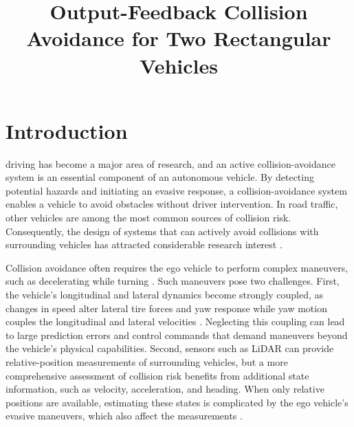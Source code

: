 \documentclass[journal]{IEEEtran}
\title{Output-Feedback Collision Avoidance for Two Rectangular Vehicles}
\author{}
\theoremstyle{definition}
\begin{document}
\maketitle

\begin{abstract}
\end{abstract}

\begin{IEEEkeywords}
\end{IEEEkeywords}

\section{Introduction}

 driving has become a major area of research,
and an active collision-avoidance system is an essential component of an
autonomous vehicle. By detecting potential hazards and initiating an
evasive response, a collision-avoidance system enables a vehicle to avoid
obstacles without driver intervention. In road traffic, other vehicles are among the most common sources of
collision risk. Consequently, the design of systems that
can actively avoid collisions with surrounding vehicles has attracted
considerable research interest \cite{LiEtAl2022Emergency,ChenChengLiZhaoWang2024}.

Collision avoidance often requires the ego vehicle to perform complex
maneuvers, such as decelerating while turning \cite{TanWuLiLiuZhang2025}.
Such maneuvers pose two challenges. First, the vehicle's longitudinal and
lateral dynamics become strongly coupled, as changes in speed alter lateral
tire forces and yaw response while yaw motion couples the longitudinal and
lateral velocities \cite{BealBoyd2019,ParkGerdes2017}. Neglecting this
coupling can lead to large prediction errors and control commands that demand
maneuvers beyond the vehicle's physical capabilities. Second, sensors
such as LiDAR can provide relative-position measurements of surrounding
vehicles, but a more comprehensive assessment of collision risk benefits
from additional state information, such as velocity, acceleration, and heading. When only relative positions are
available, estimating these states is complicated by the ego vehicle's
evasive maneuvers, which also affect the measurements
\cite{AlaiSharmaAlexanderRajamani2024,SharmaAlaiRajamani2026}.
\end{document}
